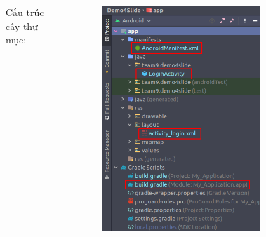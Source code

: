 \documentclass{beamer}
\begin{document}
\begin{frame}
\begin{columns}
\begin{figure}
        \end{figure}
        \indent Cấu trúc cây thư mục:
        \begin{figure}
            \centering
            \includegraphics[height=0.68\textheight]{images/25.png}
        \end{figure}
    \end{columns}
\end{frame}
\end{document}
